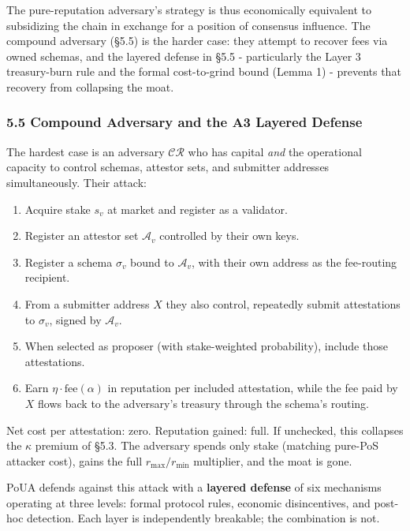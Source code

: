 \documentclass[
  11pt,
]{article}
\providecommand{\tightlist}{%
  \setlength{\itemsep}{0pt}\setlength{\parskip}{0pt}}
\begin{document}
The pure-reputation adversary's strategy is thus economically equivalent
to subsidizing the chain in exchange for a position of consensus
influence. The compound adversary (§5.5) is the harder case: they
attempt to recover fees via owned schemas, and the layered defense in
§5.5 - particularly the Layer 3 treasury-burn rule and the formal
cost-to-grind bound (Lemma 1) - prevents that recovery from collapsing
the moat.

\subsubsection{5.5 Compound Adversary and the A3 Layered
Defense}\label{compound-adversary-and-the-a3-layered-defense}

The hardest case is an adversary \(\mathcal{CR}\) who has capital
\emph{and} the operational capacity to control schemas, attestor sets,
and submitter addresses simultaneously. Their attack:

\begin{enumerate}
\def\labelenumi{\arabic{enumi}.}
\tightlist
\item
  Acquire stake \(s_v\) at market and register as a validator.
\item
  Register an attestor set \(\mathcal{A}_v\) controlled by their own
  keys.
\item
  Register a schema \(\sigma_v\) bound to \(\mathcal{A}_v\), with their
  own address as the fee-routing recipient.
\item
  From a submitter address \(X\) they also control, repeatedly submit
  attestations to \(\sigma_v\), signed by \(\mathcal{A}_v\).
\item
  When selected as proposer (with stake-weighted probability), include
  those attestations.
\item
  Earn \(\eta \cdot \text{fee}(\alpha)\) in reputation per included
  attestation, while the fee paid by \(X\) flows back to the adversary's
  treasury through the schema's routing.
\end{enumerate}

Net cost per attestation: zero. Reputation gained: full. If unchecked,
this collapses the \(\kappa\) premium of §5.3. The adversary spends only
stake (matching pure-PoS attacker cost), gains the full
\(r_{\max}/r_{\min}\) multiplier, and the moat is gone.

PoUA defends against this attack with a \textbf{layered defense} of six
mechanisms operating at three levels: formal protocol rules, economic
disincentives, and post-hoc detection. Each layer is independently
breakable; the combination is not.
\end{document}
